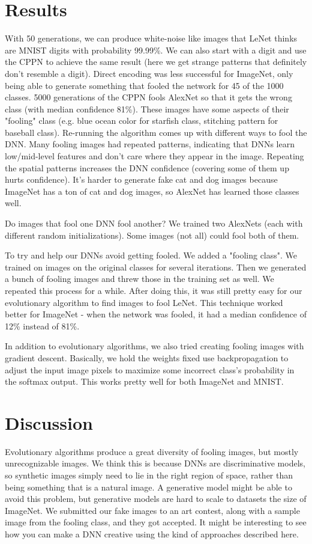 \documentclass[a4paper]{article}
\begin{document}
\section{Results}
With 50 generations, we can produce white-noise like images that LeNet thinks
are MNIST digits with probability 99.99\%. We can also start with a digit and
use the CPPN to achieve the same result (here we get strange patterns that
definitely don't resemble a digit). Direct encoding was less successful for
ImageNet, only being able to generate something that fooled the network for
45 of the 1000 classes. 5000 generations of the CPPN fools AlexNet so that
it gets the wrong class (with median confidence 81\%). These images have some
aspects of their "fooling" class (e.g. blue ocean color for starfish class,
stitching pattern for baseball class). Re-running the algorithm comes up
with different ways to fool the DNN. Many fooling images had repeated
patterns, indicating that DNNs learn low/mid-level features and don't care
where they appear in the image. Repeating the spatial patterns increases
the DNN confidence (covering some of them up hurts confidence). It's harder
to generate fake cat and dog images because ImageNet has a ton of cat and
dog images, so AlexNet has learned those classes well.

Do images that fool one DNN fool another? We trained two AlexNets (each with
different random initializations). Some images (not all) could fool both of
them.

To try and help our DNNs avoid getting fooled. We added a "fooling class". We
trained on images on the original classes for several iterations. Then we
generated a bunch of fooling images and threw those in the training set as
well. We repeated this process for a while. After doing this, it was still
pretty easy for our evolutionary algorithm to find images to fool LeNet. This
technique worked better for ImageNet - when the network was fooled, it had
a median confidence of 12\% instead of 81\%.

In addition to evolutionary algorithms, we also tried creating fooling images
with gradient descent. Basically, we hold the weights fixed use backpropagation
to adjust the input image pixels to maximize some incorrect class's probability
in the softmax output. This works pretty well for both ImageNet and MNIST.

\section{Discussion}
Evolutionary algorithms produce a great diversity of fooling images, but
mostly unrecognizable images. We think this is because DNNs are discriminative
models, so synthetic images simply need to lie in the right region of space,
rather than being something that is a natural image. A
generative model might be able to avoid this problem, but generative models are
hard to scale to datasets the size of ImageNet. We submitted our fake
images to an art contest, along with a sample image from the fooling class,
and they got accepted. It might be interesting to see how you can make a
DNN creative using the kind of approaches described here.
\end{document}
